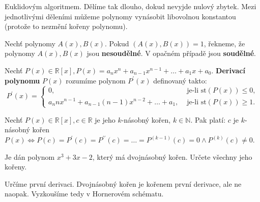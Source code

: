 \begin{reseni}
Euklidovým algoritmem. Dělíme tak dlouho, dokud nevyjde nulový zbytek.
Mezi jednotlivými děleními můžeme polynomy vynásobit libovolnou konstantou (protože
to nezmění kořeny polynomu).
\end{reseni}

\begin{definition}
  Nechť polynomy $A(x), B(x)$. Pokud $(A(x), B(x)) = 1$, řekneme, že polynomy $A(x), B(x)$ jsou \textbf{nesoudělné}. V opačném případě jsou \textbf{soudělné}.
\end{definition}

\begin{definition}
    Nechť $P(x) \in \mathbb R[x], P(x)=a_nx^n+a_{n-1}x^{n-1}+\dots+a_1x+a_0.$ \textbf{Derivací polynomu} $P(x)$ rozumíme polynom $P^\prime(x)$ definovaný takto:
    $$
        P^\prime(x)=\begin{cases}
        0, &\text{ je-li st} (P(x)) \leq 0,\\
        a_n n x^{n-1} + a_{n-1}(n-1)x^{n-2} + \dots + a_1, & \text{ je-li st} (P(x)) \geq 1.
        \end{cases}
    $$
\end{definition}


\begin{veta}
    Nechť $P(x) \in \mathbb R[x], c \in \mathbb R$ je jeho $k$-násobný kořen, $k\in \mathbb N.$ Pak platí: $c$ je
    $k$-násobný kořen $P(x) \iff P(c)=P^\prime(c)=P^{\prime \prime}(c)=\dots= P^{(k-1)}(c)=0 \land P^{(k)}(c)\ne 0$.
\end{veta}


\begin{priklad}
Je dán polynom $x^3+3x-2$, který má dvojnásobný kořen.
Určete všechny jeho kořeny.
\end{priklad}

\begin{reseni}
Určíme první derivaci. Dvojnásobný kořen je kořenem první derivace, ale ne naopak.
Vyzkoušíme tedy v Hornerovém schématu.
\end{reseni}
